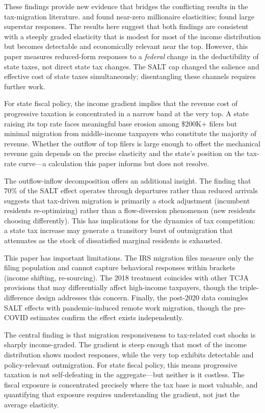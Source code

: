 \documentclass[12pt]{article}
\begin{document}
These findings provide new evidence that bridges the conflicting results in the tax-migration literature. \citet{young2011} and \citet{young2016} found near-zero millionaire elasticities; \citet{kleven2013} found large superstar responses. The results here suggest that both findings are consistent with a steeply graded elasticity that is modest for most of the income distribution but becomes detectable and economically relevant near the top. However, this paper measures reduced-form responses to a \textit{federal} change in the deductibility of state taxes, not direct state tax changes. The SALT cap changed the salience and effective cost of state taxes simultaneously; disentangling these channels requires further work.

For state fiscal policy, the income gradient implies that the revenue cost of progressive taxation is concentrated in a narrow band at the very top. A state raising its top rate faces meaningful base erosion among \$200K+ filers but minimal migration from middle-income taxpayers who constitute the majority of revenue. Whether the outflow of top filers is large enough to offset the mechanical revenue gain depends on the precise elasticity and the state's position on the tax-rate curve---a calculation this paper informs but does not resolve.

The outflow-inflow decomposition offers an additional insight. The finding that 70\% of the SALT effect operates through departures rather than reduced arrivals suggests that tax-driven migration is primarily a stock adjustment (incumbent residents re-optimizing) rather than a flow-diversion phenomenon (new residents choosing differently). This has implications for the dynamics of tax competition: a state tax increase may generate a transitory burst of outmigration that attenuates as the stock of dissatisfied marginal residents is exhausted.

This paper has important limitations. The IRS migration files measure only the filing population and cannot capture behavioral responses within brackets (income shifting, re-sourcing). The 2018 treatment coincides with other TCJA provisions that may differentially affect high-income taxpayers, though the triple-difference design addresses this concern. Finally, the post-2020 data comingles SALT effects with pandemic-induced remote work migration, though the pre-COVID estimates confirm the effect exists independently.

The central finding is that migration responsiveness to tax-related cost shocks is sharply income-graded. The gradient is steep enough that most of the income distribution shows modest responses, while the very top exhibits detectable and policy-relevant outmigration. For state fiscal policy, this means progressive taxation is not self-defeating in the aggregate---but neither is it costless. The fiscal exposure is concentrated precisely where the tax base is most valuable, and quantifying that exposure requires understanding the gradient, not just the average elasticity.
\end{document}
